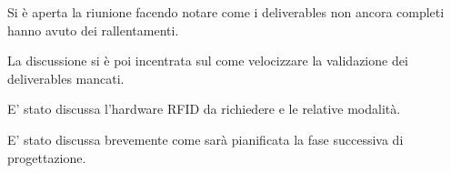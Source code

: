 Si è aperta la riunione facendo notare come i deliverables non ancora completi hanno avuto dei rallentamenti.

La discussione si è poi incentrata sul come velocizzare la validazione dei deliverables mancati.

E' stato discussa l'hardware RFID da richiedere e le relative modalità.

E' stato discussa brevemente come sarà pianificata la fase successiva di progettazione.

